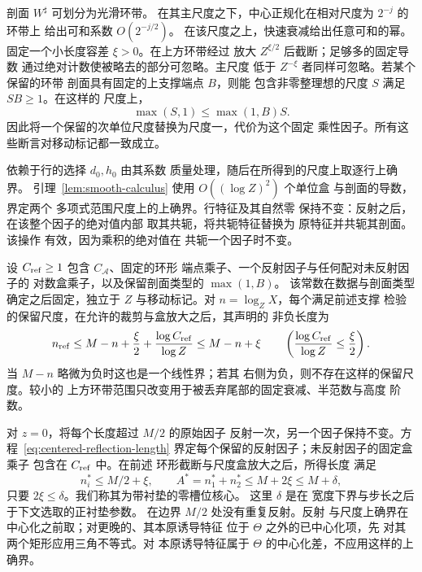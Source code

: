 \documentclass[11pt,a4paper]{article}
\numberwithin{equation}{section}
\numberwithin{figure}{section}
\theoremstyle{definition}
\theoremstyle{remark}
\begin{document}
剖面 \(W^\sharp\) 可划分为光滑环带。
在其主尺度之下，中心正规化在相对尺度为 \(2^{-j}\) 的环带上
给出可和系数 \(O(2^{-j/2})\)。
在该尺度之上，快速衰减给出任意可和的幂。
固定一个小长度容差 \(\xi>0\)。在上方环带经过
放大 \(Z^{\xi/2}\) 后截断；足够多的固定导数
通过绝对计数使被略去的部分可忽略。主尺度
低于 \(Z^{-\xi}\) 者同样可忽略。若某个保留的环带
剖面具有固定的上支撑端点 \(B\)，则能
包含非零整理想的尺度 \(S\) 满足 \(SB\ge1\)。在这样的
尺度上，
\[
 \max(S,1)\le\max(1,B)S.
\]
因此将一个保留的次单位尺度替换为尺度一，代价为这个固定
乘性因子。所有这些断言对移动标记都一致成立。

依赖于行的选择 \(d_0,h_0\) 由其系数
质量处理，随后在所得到的尺度上取逐行上确界。
引理~\ref{lem:smooth-calculus} 使用 \(O((\log Z)^2)\) 个单位盒
与剖面的导数，界定两个
多项式范围尺度上的上确界。行特征及其自然零
保持不变：反射之后，在该整个因子的绝对值内部
取其共轭，将共轭特征替换为
原特征并共轭其剖面。该操作
有效，因为乘积的绝对值在
共轭一个因子时不变。

设 \(C_{\rm ref}\ge1\) 包含 \(C_{\mathcal A}\)、固定的环形
端点乘子、一个反射因子与任何配对未反射因子的
对数盒乘子，以及保留剖面类型的 \(\max(1,B)\)。
该常数在数据与剖面类型确定之后固定，独立于
\(Z\) 与移动标记。对
\(n=\log_ZX\)，每个满足前述支撑
检验的保留尺度，在允许的裁剪与盒放大之后，其声明的
非负长度为
\begin{equation}
 n_{\rm ref}\le M-n+\frac\xi2+\frac{\log C_{\rm ref}}{\log Z}
 \le M-n+\xi
 \qquad\left(\frac{\log C_{\rm ref}}{\log Z}\le\frac\xi2\right).
 \label{eq:centered-reflection-length}
\end{equation}
当 \(M-n\) 略微为负时这也是一个线性界；若其
右侧为负，则不存在这样的保留尺度。较小的
上方环带范围只改变用于被丢弃尾部的固定衰减、半范数与高度
阶数。

对 \(z=0\)，将每个长度超过 \(M/2\) 的原始因子
反射一次，另一个因子保持不变。方程~\eqref{eq:centered-reflection-length}
界定每个保留的反射因子；未反射因子的固定盒乘子
包含在 \(C_{\rm ref}\) 中。在前述
环形截断与尺度盒放大之后，所得长度
满足
\begin{equation}
 n_i^*\le M/2+\xi,\qquad
 A^*=n_1^*+n_2^*\le M+2\xi\le M+\delta,
 \label{old-eq:2.1h}
\end{equation}
只要 \(2\xi\le\delta\)。我们称其为带衬垫的零槽位核心。
这里 \(\delta\) 是在
宽度下界与步长之后于下文选取的正衬垫参数。
在边界 \(M/2\) 处没有重复反射。反射
与尺度上确界在中心化之前取；对更晚的、其本原诱导特征
位于 \(\Theta\) 之外的已中心化项，先
对其两个矩形应用三角不等式。对
本原诱导特征属于 \(\Theta\) 的中心化差，不应用这样的上确界。
\end{document}
